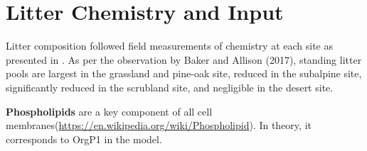 \documentclass[letterpaper, 10pt]{article}
\begin{document}
\section{\large Litter Chemistry and Input}

Litter composition followed field measurements of chemistry at each site as presented in \citep{baker2017extracellular}. As per the observation by Baker and Allison (2017), standing litter pools are largest in the grassland and pine-oak site, reduced in the subalpine site, significantly reduced in the scrubland site, and negligible in the desert site.

\textbf{Phospholipids} are a key component of all cell membranes(\url{https://en.wikipedia.org/wiki/Phospholipid}). In theory, it corresponds to OrgP1 in the model.




\end{document}
